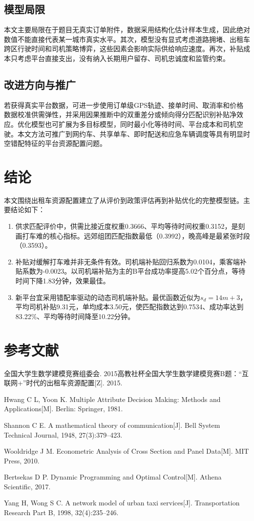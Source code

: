 \documentclass[12pt,a4paper]{ctexart}
\begin{document}
\subsection{模型局限}
本文主要局限在于题目无真实订单附件，数据采用结构化估计样本生成，因此绝对数值不能直接代表某一城市真实水平。其次，模型没有显式考虑道路拥堵、出租车跨区行驶时间和司机策略博弈，这些因素会影响实际供给响应速度。再次，补贴成本只考虑平台直接支出，没有纳入长期用户留存、司机忠诚度和监管约束。

\subsection{改进方向与推广}
若获得真实平台数据，可进一步使用订单级GPS轨迹、接单时间、取消率和价格数据校准供需弹性，并采用因果推断中的双重差分或倾向得分匹配识别补贴净效应。优化模型也可扩展为多目标模型，同时最小化等待时间、平台成本和司机空驶。本文方法可推广到网约车、共享单车、即时配送和应急车辆调度等具有明显时空错配特征的平台资源配置问题。

\section{结论}
本文围绕出租车资源配置建立了从评价到政策评估再到补贴优化的完整模型链。主要结论如下：
\begin{enumerate}[label=(\arabic*)]
  \item 供求匹配评价中，供需比接近度权重0.3666、平均等待时间权重0.3152，是刻画打车难的核心指标。远郊组团匹配指数最低（0.3992），晚高峰是最紧张时段（0.3593）。
  \item 补贴对缓解打车难并非无条件有效。司机端补贴回归系数为0.0104，乘客端补贴系数为-0.0023。以司机端补贴为主的B平台成功率提高5.02个百分点，等待时间下降1.83分钟，效果最佳。
  \item 新平台宜采用错配率驱动的动态司机端补贴。最优函数近似为$s_d=14m+3$，平均司机补贴9.31元，单均成本3.50元，使匹配指数达到0.7534、成功率达到83.22\%、平均等待时间降至10.22分钟。
\end{enumerate}

\section{参考文献}
\begin{enumerate}[label={[\arabic*]}]
  \item 全国大学生数学建模竞赛组委会. 2015高教社杯全国大学生数学建模竞赛B题：``互联网+''时代的出租车资源配置[Z]. 2015.
  \item Hwang C L, Yoon K. Multiple Attribute Decision Making: Methods and Applications[M]. Berlin: Springer, 1981.
  \item Shannon C E. A mathematical theory of communication[J]. Bell System Technical Journal, 1948, 27(3):379--423.
  \item Wooldridge J M. Econometric Analysis of Cross Section and Panel Data[M]. MIT Press, 2010.
  \item Bertsekas D P. Dynamic Programming and Optimal Control[M]. Athena Scientific, 2017.
  \item Yang H, Wong S C. A network model of urban taxi services[J]. Transportation Research Part B, 1998, 32(4):235--246.
\end{enumerate}
\end{document}
